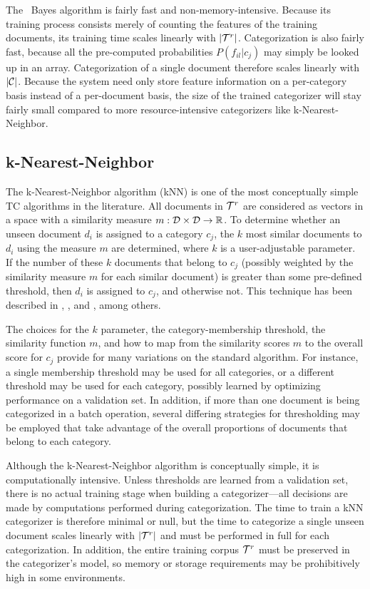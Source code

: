 The \naive\ Bayes algorithm is fairly fast and non-memory-intensive.
Because its training process consists merely of counting the features
of the training documents, its training time scales linearly with
$|\mathcal{T}^r|$.  Categorization is also fairly fast, because all the
pre-computed probabilities $P(f_{il}|c_j)$ may simply be looked up in
an array.  Categorization of a single document therefore scales
linearly with $|\mathcal{C}|$.  Because the system need only store feature
information on a per-category basis instead of a per-document basis,
the size of the trained categorizer will stay fairly small compared to
more resource-intensive categorizers like k-Nearest-Neighbor.

\subsection{k-Nearest-Neighbor}
\label{knn}

The k-Nearest-Neighbor algorithm (kNN) is one of the most conceptually
simple TC algorithms in the literature.  All documents in $\mathcal{T}^r$ are
considered as vectors in a space with a similarity measure $m: \mathcal{D}
\times \mathcal{D} \to \mathbb{R}$.  To determine whether an unseen document
$d_i$ is assigned to a category $c_j$, the $k$ most similar documents
to $d_i$ using the measure $m$ are determined, where $k$ is a
user-adjustable parameter.  If the number of these $k$ documents that
belong to $c_j$ (possibly weighted by the similarity measure $m$ for
each similar document) is greater than some pre-defined threshold,
then $d_i$ is assigned to $c_j$, and otherwise not.  This technique
has been described in \cite[p. 28]{sebastiani:02}, \cite{yang:99}, and
\cite{yang:97}, among others.

The choices for the $k$ parameter, the category-membership threshold,
the similarity function $m$, and how to map from the similarity scores
$m$ to the overall score for $c_j$ provide for many variations on the
standard algorithm.  For instance, a single membership threshold may
be used for all categories, or a different threshold may be used for
each category, possibly learned by optimizing performance on a
validation set.  In addition, if more than one document is being
categorized in a batch operation, several differing strategies for
thresholding may be employed that take advantage of the overall
proportions of documents that belong to each category.\cite{yang:01}

Although the k-Nearest-Neighbor algorithm is conceptually simple, it
is computationally intensive.  Unless thresholds are learned from a
validation set, there is no actual training stage when building a
categorizer---all decisions are made by computations performed during
categorization.  The time to train a kNN categorizer is therefore
minimal or null, but the time to categorize a single unseen document
scales linearly with $|\mathcal{T}^r|$ and must be performed in full for each
categorization.  In addition, the entire training corpus $\mathcal{T}^r$ must
be preserved in the categorizer's model, so memory or storage
requirements may be prohibitively high in some environments.

